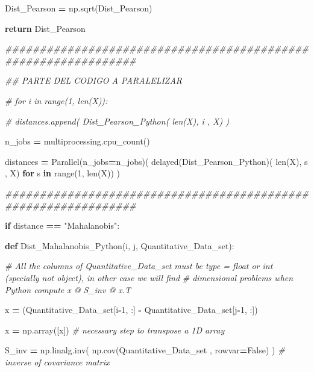 \documentclass[
  11pt,
  a4paper,
]{article}
\newenvironment{Shaded}{\begin{snugshade}}{\end{snugshade}}
\newcommand{\BuiltInTok}[1]{#1}
\newcommand{\CommentTok}[1]{\textcolor[rgb]{0.56,0.35,0.01}{\textit{#1}}}
\newcommand{\ControlFlowTok}[1]{\textcolor[rgb]{0.13,0.29,0.53}{\textbf{#1}}}
\newcommand{\DecValTok}[1]{\textcolor[rgb]{0.00,0.00,0.81}{#1}}
\newcommand{\KeywordTok}[1]{\textcolor[rgb]{0.13,0.29,0.53}{\textbf{#1}}}
\newcommand{\NormalTok}[1]{#1}
\newcommand{\OperatorTok}[1]{\textcolor[rgb]{0.81,0.36,0.00}{\textbf{#1}}}
\newcommand{\StringTok}[1]{\textcolor[rgb]{0.31,0.60,0.02}{#1}}
\newcommand{\VariableTok}[1]{\textcolor[rgb]{0.00,0.00,0.00}{#1}}
\begin{document}
\begin{Shaded}
\begin{Highlighting}[]
\NormalTok{            Dist\_Pearson }\OperatorTok{=}\NormalTok{ np.sqrt(Dist\_Pearson)}

            \ControlFlowTok{return}\NormalTok{ Dist\_Pearson}

\CommentTok{\#\#\#\#\#\#\#\#\#\#\#\#\#\#\#\#\#\#\#\#\#\#\#\#\#\#\#\#\#\#\#\#\#\#\#\#\#\#\#\#\#\#\#\#\#\#\#\#\#\#\#\#\#\#\#\#\#\#\#\#\#\#\#}

       \CommentTok{\#\# PARTE DEL CODIGO A PARALELIZAR}
       
       \CommentTok{\# for i in range(1, len(X)):}

        \CommentTok{\#   distances.append( Dist\_Pearson\_Python( len(X), i , X) )}

        
\NormalTok{        n\_jobs  }\OperatorTok{=}\NormalTok{ multiprocessing.cpu\_count()}

\NormalTok{        distances }\OperatorTok{=}\NormalTok{ Parallel(n\_jobs}\OperatorTok{=}\NormalTok{n\_jobs)( delayed(Dist\_Pearson\_Python)( }\BuiltInTok{len}\NormalTok{(X), s , X) }\ControlFlowTok{for}\NormalTok{ s }\KeywordTok{in} \BuiltInTok{range}\NormalTok{(}\DecValTok{1}\NormalTok{, }\BuiltInTok{len}\NormalTok{(X)) )}

\CommentTok{\#\#\#\#\#\#\#\#\#\#\#\#\#\#\#\#\#\#\#\#\#\#\#\#\#\#\#\#\#\#\#\#\#\#\#\#\#\#\#\#\#\#\#\#\#\#\#\#\#\#\#\#\#\#\#\#\#\#\#\#\#\#\#}
    
    \ControlFlowTok{if}\NormalTok{ distance }\OperatorTok{==} \StringTok{"Mahalanobis"}\NormalTok{:}

        \KeywordTok{def}\NormalTok{ Dist\_Mahalanobis\_Python(i, j, Quantitative\_Data\_set):}

            \CommentTok{\# All the columns of Quantitative\_Data\_set must be type = \textquotesingle{}float\textquotesingle{} or \textquotesingle{}int\textquotesingle{} (specially not \textquotesingle{}object\textquotesingle{}), in other case we will find }
            \CommentTok{\# dimensional problems when Python compute   x @ S\_inv @ x.T}

\NormalTok{            x }\OperatorTok{=}\NormalTok{ (Quantitative\_Data\_set[i}\OperatorTok{{-}}\DecValTok{1}\NormalTok{, :] }\OperatorTok{{-}}\NormalTok{ Quantitative\_Data\_set[j}\OperatorTok{{-}}\DecValTok{1}\NormalTok{, :])}

\NormalTok{            x }\OperatorTok{=}\NormalTok{ np.array([x]) }\CommentTok{\# necessary step to transpose a 1D array}

\NormalTok{            S\_inv }\OperatorTok{=}\NormalTok{ np.linalg.inv( np.cov(Quantitative\_Data\_set , rowvar}\OperatorTok{=}\VariableTok{False}\NormalTok{) ) }\CommentTok{\# inverse of covariance matrix}


\end{Highlighting}
\end{Shaded}
\end{document}

